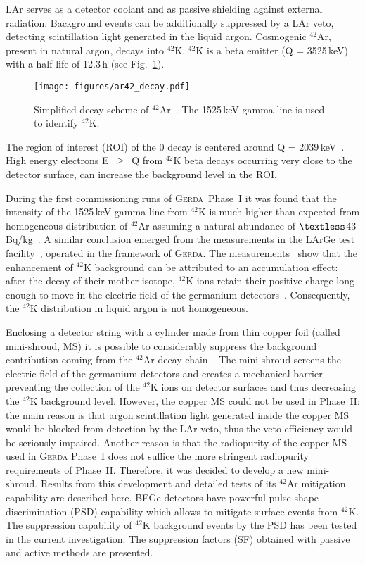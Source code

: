 \documentclass[twocolumn,epjc3]{svjour3}
\newcommand{\bbno} {{0\textnu\textbeta\textbeta\xspace}}
\newcommand{\Gerda} {{\textsc{Gerda}\xspace}}
\newcommand{\LArGe} {{{LArGe}\xspace}}
\newcommand{\I}[2]{$^{#1}$#2}
\newcommand{\tsb}{\textsubscript}
\begin{document}
LAr serves as a detector coolant and as passive shielding against external radiation. Background events can be additionally suppressed by a LAr veto, detecting scintillation light generated in the liquid argon. Cosmogenic \I{42}{Ar}, present in natural argon, decays into \I{42}{K}. \I{42}{K} is a beta emitter (Q\tsb{\textbeta} = 3525\,keV) with a half-life of 12.3\,h (see Fig.~\ref{fig:decay}).
\label{sec:intro}
%
\begin{figure}
  \begin{center}
    \texttt{[image: figures/ar42\_decay.pdf]}
    \caption{\label{fig:decay}Simplified decay scheme of \I{42}{Ar}~\cite{ToI}. The 1525\,keV gamma line is used to identify \I{42}{K}.}
  \end{center}
\end{figure}
%
The region of interest (ROI) of the \bbno{} decay is centered around Q\tsb{\textbeta\textbeta} = 2039\,keV~\cite{qbb}. 
High energy electrons E~$\ge$~Q\tsb{\textbeta\textbeta} from \I{42}{K} beta decays occurring very close to the detector surface, can increase the background level in the ROI.
 
During the first commissioning runs of \Gerda{}~Phase~I it was found that the intensity of the 1525\,keV gamma line from \I{42}{K} is much higher than expected from homogeneous distribution of \I{42}{Ar} assuming a natural abundance of $\textless$43\,\textmu Bq/kg~\cite{Ash03}. A similar conclusion emerged from the measurements in the \LArGe{} test facility~\cite{LArGe}, operated in the framework of \Gerda. The measurements~\cite{GERDAbkg} show that the enhancement of \I{42}{K} background can be attributed to an accumulation effect: after the decay of their mother isotope, \I{42}{K} ions retain their positive charge long enough to move in the electric field of the germanium detectors~\cite{Pelczar2016}. Consequently, the \I{42}{K} distribution in liquid argon is not homogeneous.

Enclosing a detector string with a cylinder made from thin copper foil (called mini-shroud, MS) it is possible to considerably suppress the background contribution coming from the \I{42}{Ar} decay chain~\cite{GERDA}. The mini-shroud screens the electric field of the germanium detectors and creates a mechanical barrier preventing the collection of the \I{42}{K} ions on detector surfaces and thus decreasing the \I{42}{K} background level. However, the copper MS could not be used in Phase~II: the main reason is that argon scintillation light generated inside the copper MS would be blocked from detection by the LAr veto, thus the veto efficiency would be seriously impaired. Another reason is that the radiopurity of the copper MS used in \Gerda{} Phase~I does not suffice the more stringent radiopurity requirements of Phase~II. Therefore, it was decided to develop a new mini-shroud. Results from this development and detailed tests of its \I{42}{Ar} mitigation capability are described here. BEGe detectors have powerful pulse shape discrimination (PSD) capability which allows to mitigate surface events from \I{42}{K}. The suppression capability of \I{42}{K} background events by the PSD has been tested in the current investigation. The suppression factors (SF) obtained with passive and active methods are presented. 
\end{document}
